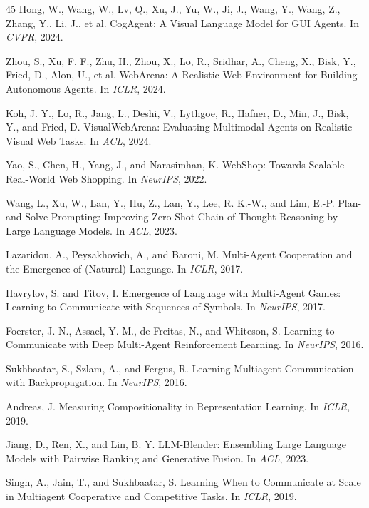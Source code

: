 \documentclass{article}
\begin{document}
\begin{thebibliography}{45}
 Hong, W., Wang, W., Lv, Q., Xu, J., Yu, W., Ji, J., Wang, Y., Wang, Z., Zhang, Y., Li, J., et al. CogAgent: A Visual Language Model for GUI Agents. In \emph{CVPR}, 2024.

 Zhou, S., Xu, F. F., Zhu, H., Zhou, X., Lo, R., Sridhar, A., Cheng, X., Bisk, Y., Fried, D., Alon, U., et al. WebArena: A Realistic Web Environment for Building Autonomous Agents. In \emph{ICLR}, 2024.

 Koh, J. Y., Lo, R., Jang, L., Deshi, V., Lythgoe, R., Hafner, D., Min, J., Bisk, Y., and Fried, D. VisualWebArena: Evaluating Multimodal Agents on Realistic Visual Web Tasks. In \emph{ACL}, 2024.

 Yao, S., Chen, H., Yang, J., and Narasimhan, K. WebShop: Towards Scalable Real-World Web Shopping. In \emph{NeurIPS}, 2022.

 Wang, L., Xu, W., Lan, Y., Hu, Z., Lan, Y., Lee, R. K.-W., and Lim, E.-P. Plan-and-Solve Prompting: Improving Zero-Shot Chain-of-Thought Reasoning by Large Language Models. In \emph{ACL}, 2023.

 Lazaridou, A., Peysakhovich, A., and Baroni, M. Multi-Agent Cooperation and the Emergence of (Natural) Language. In \emph{ICLR}, 2017.

 Havrylov, S. and Titov, I. Emergence of Language with Multi-Agent Games: Learning to Communicate with Sequences of Symbols. In \emph{NeurIPS}, 2017.

 Foerster, J. N., Assael, Y. M., de Freitas, N., and Whiteson, S. Learning to Communicate with Deep Multi-Agent Reinforcement Learning. In \emph{NeurIPS}, 2016.

 Sukhbaatar, S., Szlam, A., and Fergus, R. Learning Multiagent Communication with Backpropagation. In \emph{NeurIPS}, 2016.

 Andreas, J. Measuring Compositionality in Representation Learning. In \emph{ICLR}, 2019.

 Jiang, D., Ren, X., and Lin, B. Y. LLM-Blender: Ensembling Large Language Models with Pairwise Ranking and Generative Fusion. In \emph{ACL}, 2023.

 Singh, A., Jain, T., and Sukhbaatar, S. Learning When to Communicate at Scale in Multiagent Cooperative and Competitive Tasks. In \emph{ICLR}, 2019.


\end{thebibliography}
\end{document}
